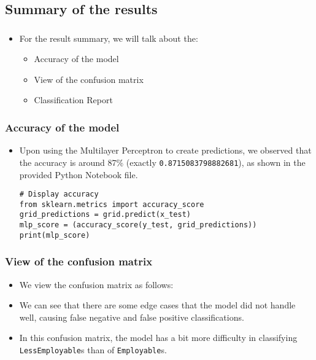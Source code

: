 \subsection{Summary of the results}
\begin{frame}
\frametitle{\subsecname}
	\begin{itemize}
		\item For the result summary, we will talk about the:
		\begin{itemize}
			\item Accuracy of the model
			\item View of the confusion matrix
			\item Classification Report
		\end{itemize}
	\end{itemize}
\end{frame}

\begin{frame}[fragile]
\frametitle{Accuracy of the model}
	\begin{itemize}
		\item Upon using the Multilayer Perceptron to create predictions, we observed that the accuracy is around 87\% (exactly \texttt{0.8715083798882681}), as shown in the provided Python Notebook file.
\begin{verbatim}
# Display accuracy
from sklearn.metrics import accuracy_score
grid_predictions = grid.predict(x_test)
mlp_score = (accuracy_score(y_test, grid_predictions))
print(mlp_score)
\end{verbatim}
	\end{itemize}
\end{frame}

\begin{frame}[fragile]
\frametitle{View of the confusion matrix}
	\begin{itemize}
		\item We view the confusion matrix as follows:
		\item We can see that there are some edge cases that the model did not handle well, causing false negative and false positive classifications.
		\item In this confusion matrix, the model has a bit more difficulty in classifying \texttt{LessEmployable}s than of \texttt{Employable}s.
	\end{itemize}
\end{frame}

